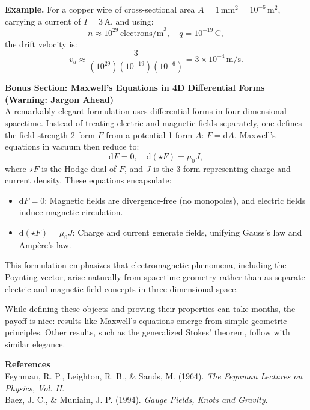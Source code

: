 \begin{technical}
\noindent\textbf{Example.} For a copper wire of cross-sectional area \( A = 1 \, \text{mm}^2 = 10^{-6} \, \text{m}^2 \), carrying a current of \( I = 3 \, \text{A} \), and using:
\[
n \approx 10^{29} \, \text{electrons/m}^3, \quad q = 10^{-19} \, \text{C},
\]
the drift velocity is:
\[
v_d \approx \frac{3}{(10^{29})(10^{-19})(10^{-6})} = 3 \times 10^{-4} \, \text{m/s}.
\]

\vspace{1em}
\noindent\textbf{Bonus Section: Maxwell’s Equations in 4D Differential Forms (Warning: Jargon Ahead)}\\[0.5em]
A remarkably elegant formulation uses differential forms in four-dimensional spacetime. Instead of treating electric and magnetic fields separately, one defines the field-strength 2-form \(F\) from a potential 1-form \(A\): $F = \mathrm{d}A$. Maxwell's equations in vacuum then reduce to:
\[
\mathrm{d}F = 0, 
\quad
\mathrm{d}(\star F) = \mu_0 J,
\]
where \(\star F\) is the Hodge dual of \(F\), and \(J\) is the 3-form representing charge and current density. These equations encapsulate:
\begin{itemize}[leftmargin=*]
\item \(\mathrm{d}F = 0\): Magnetic fields are divergence-free (no monopoles), and electric fields induce magnetic circulation.
\item \(\mathrm{d}(\star F) = \mu_0 J\): Charge and current generate fields, unifying Gauss's law and Ampère's law.
\end{itemize}
This formulation emphasizes that electromagnetic phenomena, including the Poynting vector, arise naturally from spacetime geometry rather than as separate electric and magnetic field concepts in three-dimensional space. 

While defining these objects and proving their properties can take months, the payoff is nice: results like Maxwell’s equations emerge from simple geometric principles. Other results, such as the generalized Stokes’ theorem, follow with similar elegance.

\vspace{0.7em}
\noindent\textbf{References}\\
Feynman, R. P., Leighton, R. B., \& Sands, M. (1964). \textit{The Feynman Lectures on Physics, Vol. II}.\\
Baez, J. C., \& Muniain, J. P. (1994). \textit{Gauge Fields, Knots and Gravity}.\\
\end{technical}